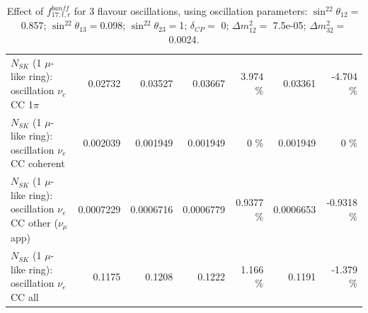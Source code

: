 \begin{table}
\begin{tabular}{| l | r | r | r  r | r  r |}
                     $N_{SK}$ (1 $\mu$-like ring): oscillation $\nu_e$ CC 1$\pi$ &         0.02732 &         0.03527 &         0.03667 &    3.974 \%  &         0.03361 &   -4.704 \%  \\ 
                   $N_{SK}$ (1 $\mu$-like ring): oscillation $\nu_e$ CC coherent &        0.002039 &        0.001949 &        0.001949 &        0 \%  &        0.001949 &        0 \%  \\ 
      $N_{SK}$ (1 $\mu$-like ring): oscillation $\nu_e$ CC other ($\nu_\mu$ app) &       0.0007229 &       0.0006716 &       0.0006779 &   0.9377 \%  &       0.0006653 &  -0.9318 \%  \\ 
                       $N_{SK}$ (1 $\mu$-like ring): oscillation $\nu_e$  CC all &          0.1175 &          0.1208 &          0.1222 &    1.166 \%  &          0.1191 &   -1.379 \%  \\ 
\hline
\hline
\end{tabular}
\caption{ Effect of $f_{17; t, r}^{banff}$ for 3 flavour oscillations, using oscillation parameters:  $\sin^22\theta_{12} = $0.857; $\sin^22\theta_{13} = $0.098; $\sin^22\theta_{23} = $1; $\delta_{CP} = $        0; $\Delta m^2_{12} = $    7.5e-05; $\Delta m^2_{32} = $    0.0024. }
\label{tab:num_banff_mares_1RmuT_3f_osc_t13:0.098}
\end{table}
\clearpage
